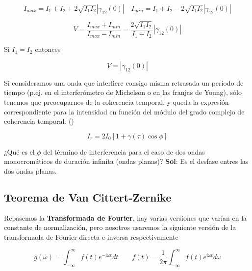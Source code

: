 \documentclass[12pt,a4paper]{report}
\newcommand{\esp}{\vspace{0.5cm}}
\begin{document}
	\begin{equation*}
		I_{max} = I_1 + I_2 + 2\sqrt{I_1I_2}|\gamma_{12}(0)| \quad I_{min} = I_1 + I_2 - 2\sqrt{I_1I_2}|\gamma_{12}(0)|
	\end{equation*}
	
	\begin{equation}
		V = \dfrac{I_{max}+I_{min}}{I_{max}-I_{min}} = \dfrac{2\sqrt{I_1I_2}}{I_1+I_2}|\gamma_{12}(0)|
	\end{equation}
	
	\esp
	
	\noindent Si $I_1=I_2$ entonces
	
	\begin{equation}
		V = |\gamma_{12}(0)|
	\end{equation}
	
	\esp
	
	Si consideramos una onda que interfiere consigo misma retrasada un período de tiempo (p.ej. en el interferómetro de Michelson o en las franjas de Young), sólo tenemos que preocuparnos de la coherencia
	temporal, y queda la expresión correspondiente para la intensidad en función del módulo del grado complejo de coherencia temporal. (\cite{Resumen})
	
	\begin{equation}
		I_r = 2I_0[1+\gamma(\tau)\cos\phi]
	\end{equation}
	
	\esp
	
	\begin{Socrative}
		¿Qué es el $\phi$ del término de interferencia para el caso de dos ondas monocromáticos de duración infinita (ondas planas)? \textbf{Sol}: Es el desfase entres las dos ondas planas.
	\end{Socrative}
	
	\esp
	
	\subsection{Teorema de Van Cittert-Zernike}
	
	Repasemos la \textbf{Transformada de Fourier}, hay varias versiones que varían en la constante de normalización, pero nosotros usaremos la siguiente versión de la transformada de Fourier directa e inversa respectivamente
	
	\begin{equation}
		g(\omega)=\int_{-\infty}^\infty f(t) e^{-i\omega t}dt \qquad f(t) = \frac{1}{2\pi}\int_{-\infty}^\infty f(t) e^{i\omega t}d\omega
	\end{equation}
	
\end{document}
